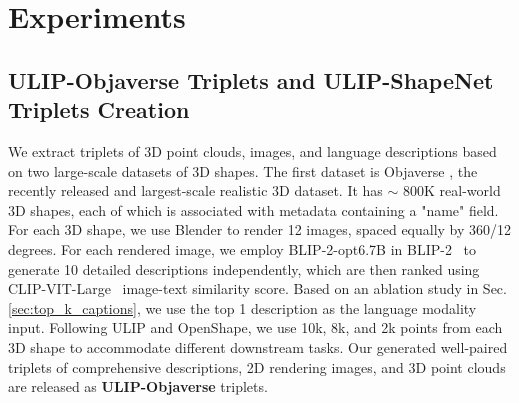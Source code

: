 \documentclass[10pt,twocolumn,letterpaper]{article}
\begin{document}






\section{Experiments}

\subsection{ULIP-Objaverse Triplets and ULIP-ShapeNet Triplets Creation}
We extract triplets of 3D point clouds, images, and language descriptions based on two large-scale datasets of 3D shapes. The first dataset is Objaverse \cite{Deitke2022objaverse}, the recently released and largest-scale realistic 3D dataset. It has $\sim$ 800K real-world 3D shapes, each of which is associated with metadata containing a "name" field.  For each 3D shape, we use Blender \cite{kent20153d} to render 12 images, spaced equally by 360/12 degrees. For each rendered image, we employ BLIP-2-opt6.7B in BLIP-2~\citep{li2023blip} to generate 10 detailed descriptions independently, which are then ranked using CLIP-VIT-Large~\citep{radford2021learning} image-text similarity score. Based on an ablation study in Sec. \ref{sec:top_k_captions}, we use the top 1 description as the language modality input. Following ULIP and OpenShape, we use 10k, 8k, and 2k points from each 3D shape to accommodate different downstream tasks. Our generated well-paired triplets of comprehensive descriptions, 2D rendering images, and 3D point clouds are released as \textbf{ULIP-Objaverse} triplets.
\end{document}

